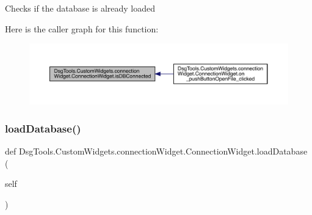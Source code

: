 \begin{DoxyVerb}Checks if the database is already loaded
\end{DoxyVerb}
 Here is the caller graph for this function\+:
\nopagebreak
\begin{figure}[H]
\begin{center}
\leavevmode
\includegraphics[width=350pt]{class_dsg_tools_1_1_custom_widgets_1_1connection_widget_1_1_connection_widget_a4f15ad54d84acb8cd9dc06906e54a8d1_icgraph}
\end{center}
\end{figure}
\mbox{\label{class_dsg_tools_1_1_custom_widgets_1_1connection_widget_1_1_connection_widget_a096129937bbcdb652013088000273af0}} 
\subsubsection{\texorpdfstring{load\+Database()}{loadDatabase()}}
{\footnotesize\ttfamily def Dsg\+Tools.\+Custom\+Widgets.\+connection\+Widget.\+Connection\+Widget.\+load\+Database (\begin{DoxyParamCaption}\item[{}]{self }\end{DoxyParamCaption})}

